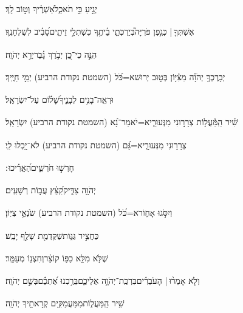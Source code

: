 \documentclass[12pt]{article}
\newcommand{\loc}[1]{\textsuperscript{\locf{#1}}}
\begin{document}
{\loc{ ב}~}‏יְגִ֣יעַ  כִּ֣י תֹאכֵ֑ל{\hfill}אַ֝שְׁרֶ֗יךָ וְט֣וֹב לָֽךְ׃\par

{\loc{ ג}~}‏אֶשְׁתְּךָ֤ |  כְּגֶ֥פֶן פֹּרִיָּה֮{\hfill}בְּיַרְכְּתֵ֢י בֵ֫יתֶ֥ךָ\newline\hspace*{.5em} כִּשְׁתִלֵ֣י זֵיתִ֑ים{\hfill}סָ֝בִ֗יב לְשֻׁלְחָנֶֽךָ׃\par

{\loc{ ד}~}‏הִנֵּ֣ה כִי־כֵ֭ן יְבֹ֥רַךְ גָּ֗בֶר{\hfill}יְרֵ֣א יְהֹוָֽה׃\par

{\loc{ ה}~}‏יְבָרֶכְךָ֥ יְהֹוָ֗ה מִצִּ֫יּ֥וֹן{\hfill} בְּט֣וּב יְרוּשׁא=כֹּ֝ל (השמטת נקודת הרביע) יְמֵ֣י חַיֶּֽיךָ׃\par

{\loc{ ו}~}‏וּרְאֵֽה־בָנִ֥ים לְבָנֶ֑יךָ{\hfill}שָׁ֝ל֗וֹם עַל־יִשְׂרָאֵֽל׃\par\pend

\pstart[\subsection*{\textcolor{red}{פרק קכט}}]\label{פרק קכט}
{\loc{ א}~}‏שִׁ֗יר הַֽמַּ֫עֲל֥וֹת\newline\hspace*{.5em} צְרָר֣וּנִי מִנְּעוּרַ֑י{\hfill}א=יֹאמַר־נָ֝א (השמטת נקודת הרביע) יִשְׂרָאֵֽל׃\par

{\loc{ ב}~}‏ צְרָר֣וּנִי מִנְּעוּרָ֑י{\hfill}א=גַּ֝ם (השמטת נקודת הרביע) לֹא־יָ֥כְלוּ לִֽי׃\par

{\loc{ ג}~}‏ חָרְשׁ֣וּ חֹרְשִׁ֑ים{\hfill}הֶ֝אֱרִ֗יכוּ ׃\par

{\loc{ ד}~}‏יְהֹוָ֥ה צַדִּ֑יק{\hfill}קִ֝צֵּ֗ץ עֲב֣וֹת רְשָׁעִֽים׃\par

{\loc{ ה}~}‏ וְיִסֹּ֣גוּ אָח֑וֹר{\hfill}א=כֹּ֝ל (השמטת נקודת הרביע) שֹׂנְאֵ֥י צִיּֽוֹן׃\par

{\loc{ ו}~}‏ כַּחֲצִ֣יר גַּגּ֑וֹת{\hfill}שֶׁקַּדְמַ֖ת שָׁלַ֣ף יָבֵֽשׁ׃\par

{\loc{ ז}~}‏שֶׁלֹּ֤א מִלֵּ֖א כַפּ֥וֹ קוֹצֵ֗ר{\hfill}וְחִצְנ֥וֹ מְעַמֵּֽר׃\par

{\loc{ ח}~}‏וְלֹ֤א אָמְר֨וּ |  הָעֹבְרִ֗ים{\hfill}בִּרְכַּֽת־יְהֹוָ֥ה אֲלֵיכֶ֑ם\newline\hspace*{.5em}בֵּרַ֥כְנוּ אֶ֝תְכֶ֗ם{\hfill}בְּשֵׁ֣ם יְהֹוָֽה׃\par\pend
\ledpb
\pstart[\subsection*{\textcolor{red}{פרק קל}}]\label{פרק קל}
{\loc{ א}~}‏שִׁ֥יר הַֽמַּעֲל֑וֹת\newline\hspace*{.5em}מִמַּעֲמַקִּ֖ים קְרָאתִ֣יךָ יְהֹוָֽה׃\par
\end{document}
